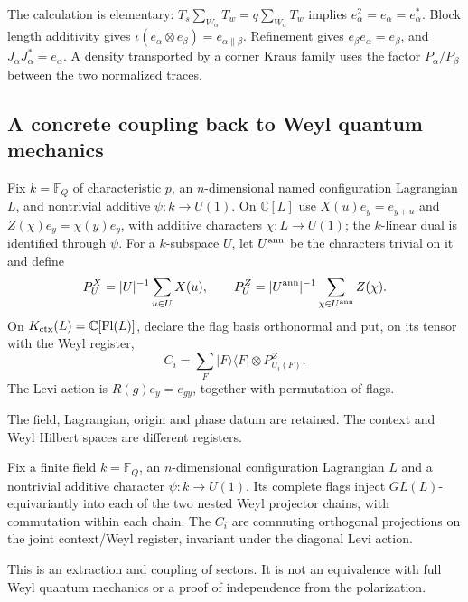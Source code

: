 The calculation is elementary: $T_s\sum_{W_\alpha}T_w=q\sum_{W_\alpha}T_w$
implies $e_\alpha^2=e_\alpha=e_\alpha^*$. Block length additivity gives
$\iota(e_\alpha\otimes e_\beta)=e_{\alpha\mathbin{\|}\beta}$.
Refinement gives $e_\beta e_\alpha=e_\beta$, and
$J_\alpha J_\alpha^*=e_\alpha$. A density transported by a corner Kraus
family uses the factor $P_\alpha/P_\beta$ between the two normalized traces.

\subsection{A concrete coupling back to Weyl quantum mechanics}

\begin{definition}
Fix $k=\mathbb F_Q$ of characteristic $p$, an $n$-dimensional named
configuration Lagrangian $L$, and nontrivial additive
$\psi:k\to U(1)$. On $\mathbb C[L]$ use
$X(u)e_y=e_{y+u}$ and $Z(\chi)e_y=\chi(y)e_y$, with additive characters
$\chi:L\to U(1)$; the $k$-linear dual is identified through $\psi$.
For a $k$-subspace $U$, let $U^{\rm ann}$ be the characters trivial on it
and define
\[
P_U^X=|U|^{-1}\sum_{u\in U}X(u),\qquad
P_U^Z=|U^{\rm ann}|^{-1}\sum_{\chi\in U^{\rm ann}}Z(\chi).
\]
On $K_{\rm ctx}(L)=\mathbb C[\operatorname{Fl}(L)]$, declare the flag
basis orthonormal and put, on its tensor with the Weyl register,
\[
C_i=\sum_F|F\rangle\langle F|\otimes P_{U_i(F)}^Z.
\]
The Levi action is $R(g)e_y=e_{gy}$, together with permutation of flags.
\end{definition}
\begin{scope}The field, Lagrangian, origin and phase datum are retained.
The context and Weyl Hilbert spaces are different registers.\end{scope}

\begin{proposition}
{\normalfont\statusSketch}\quad Fix a finite field $k=\mathbb F_Q$, an
$n$-dimensional configuration Lagrangian $L$ and a nontrivial additive
character $\psi:k\to U(1)$. Its complete flags inject $GL(L)$-equivariantly
into each of the two nested Weyl projector chains, with commutation
within each chain. The $C_i$ are commuting orthogonal
projections on the joint context/Weyl register, invariant under the
diagonal Levi action.
\end{proposition}
\begin{scope}This is an extraction and coupling of sectors. It is not an
equivalence with full Weyl quantum mechanics or a proof of independence
from the polarization.\end{scope}


